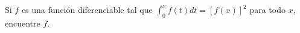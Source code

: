 \item Si $f$ es una función diferenciable tal que $\int_0^x f(t) dt = [f(x)]^2$ para todo $x$, encuentre $f$.
